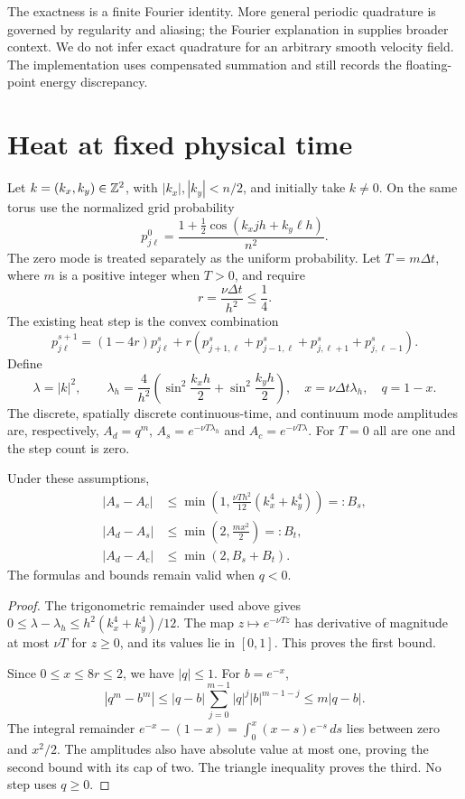 The exactness is a finite Fourier identity. More general periodic
quadrature is governed by regularity and aliasing; the Fourier explanation
in \citet[Section~3]{frTrefethenWeideman2014} supplies broader context.
We do not infer exact quadrature for an arbitrary smooth velocity field.
The implementation uses compensated summation and still records the
floating-point energy discrepancy.

\section{Heat at fixed physical time}

Let $k=(k_x,k_y)\in\mathbb{Z}^2$, with $|k_x|,|k_y|<n/2$, and initially take
$k\ne0$. On the same torus use the normalized grid probability
\[
 p^0_{j\ell}=\frac{1+\frac12\cos(k_xjh+k_y\ell h)}{n^2}.
\]
The zero mode is treated separately as the uniform probability. Let
$T=m\Delta t$, where $m$ is a positive integer when $T>0$, and require
\[
 r=\frac{\nu\Delta t}{h^2}\le\frac14.
\]
The existing heat step is the convex combination
\[
 p^{s+1}_{j\ell}=(1-4r)p^s_{j\ell}
    +r(p^s_{j+1,\ell}+p^s_{j-1,\ell}
        +p^s_{j,\ell+1}+p^s_{j,\ell-1}).
\]
Define
\[
 \lambda=|k|^2,\qquad
 \lambda_h=\frac4{h^2}
   \left(\sin^2\frac{k_xh}{2}+\sin^2\frac{k_yh}{2}\right),
 \quad x=\nu\Delta t\lambda_h,\quad q=1-x.
\]
The discrete, spatially discrete continuous-time, and continuum mode
amplitudes are, respectively,
$A_d=q^m$, $A_s=e^{-\nu T\lambda_h}$ and $A_c=e^{-\nu T\lambda}$.
For $T=0$ all are one and the step count is zero.

\begin{proposition}
\label{prop:fr-heat-mode}
Under these assumptions,
\begin{align*}
 |A_s-A_c|&\le
    \min\left(1,\frac{\nu T h^2}{12}(k_x^4+k_y^4)\right)=:B_s,\\
 |A_d-A_s|&\le\min\left(2,\frac{mx^2}{2}\right)=:B_t,\\
 |A_d-A_c|&\le\min(2,B_s+B_t).
\end{align*}
The formulas and bounds remain valid when $q<0$.
\end{proposition}
\begin{proof}
The trigonometric remainder used above gives
$0\le\lambda-\lambda_h\le h^2(k_x^4+k_y^4)/12$.
The map $z\mapsto e^{-\nu Tz}$ has derivative of magnitude at most
$\nu T$ for $z\ge0$, and its values lie in $[0,1]$. This proves the
first bound.

Since $0\le x\le8r\le2$, we have $|q|\le1$. For $b=e^{-x}$,
\[
 |q^m-b^m|
 \le |q-b|\sum_{j=0}^{m-1}|q|^j|b|^{m-1-j}
 \le m|q-b|.
\]
The integral remainder
$e^{-x}-(1-x)=\int_0^x(x-s)e^{-s}\,ds$
lies between zero and $x^2/2$. The amplitudes also have absolute value at
most one, proving the second bound with its cap of two. The triangle
inequality proves the third. No step uses $q\ge0$.
\end{proof}

